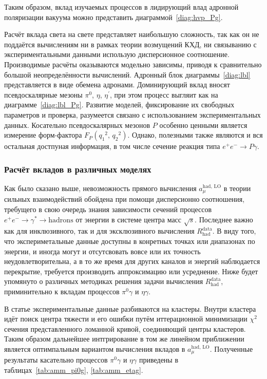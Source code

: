 Таким образом,
вклад изучаемых процессов в лидирующий влад адронной поляризации вакуума можно представить диаграммой~\ref{diag:hvp_Pg}.

Расчёт вклада света на свете представляет наибольшую сложность,
так как он не поддаётся вычислениям ни в рамках теории возмущений КХД,
ни связыванию с экспериментальными данными использую дисперсионное соотношение.
Производимые расчёты оказываются модельно зависимы,
приводя к сравнительно большой неопределённости вычислений.
Адронный блок диаграммы~\ref{diag:lbl} представляется в виде обемена адронами.
Доминирующий вклад вносят псевдоскалярные мезоны $\pi^0$, $\eta$, $\eta^\prime$,
при этом процесс выгляит как на диаграмме~\ref{diag:lbl_Pg}.
Развитие моделей,
фиксирование их свободных параметров и проверка,
разумеется связано с использованием экспериментальных данных.
Косательно псевдоскалярных мезонов $P$ особенно ценными является измерение форм-фактора
$F_P ( {q_1}^2, \, {q_2}^2 )$.
Однако, полезными также являются и вся остальная достпуная информация,
в том числе сечение реакция типа $e^+ e^- \to P \gamma$.


\subsubsection{Расчёт вкладов в различных моделях}
\label{contribution-calculation}


Как было сказано выше,
невозможность прямого вычисления $a_\mu^{\text{had, LO}}$
в теории сильных взаимодействий обойдена при помощи дисперсионно соотношения,
требущего в свою очередь знания зависимости сечений процессов
$e^+ e^- \to \gamma^* \to \text{hadrons}$
от энергии в системе центра масс $\sqrt{s}$.
Последнее важно как для инклюзивного,
так и для эксклюзивного вычисления $R_{\text{had}}^{\text{data}}$.
В виду того,
что экспериметальные данные доступны в конретных точках или диапазонах по энергии,
и иногда могут и отсутсвовать вовсе или их точность неудовлетворительна,
а в то же время для других каналов и энергий наблюдается перекрытие,
требуется производить аппроксимацию или усреднение.
Ниже будет упомянуто о различных методиках решения задачи вычисления $R_{\text{had}}^{\text{data}}$,
приминительно к вкладам процессов $\pi^0 \gamma$ и $\eta \gamma$.


В статье \cite{KNT18} экспериментальные данные разбиваются на кластеры.
Внутри кластера идёт поиск центра тяжести и его ошибки путём иттерационной минимизации $\chi^2$ сечения
представленного ломанной кривой, соединяющий центры кластеров.
Таким образом дальнейшее интгрирование в том же линейном приближении является оптимпальным вариантом вычисления вкладов в $a_\mu^{\text{had, LO}}$.
Полученные результаты касательно процессов $\pi^0 \gamma$ и $\eta \gamma$ приведены в таблицах~\ref{tab:amm_pi0g}, \ref{tab:amm_etag}.

